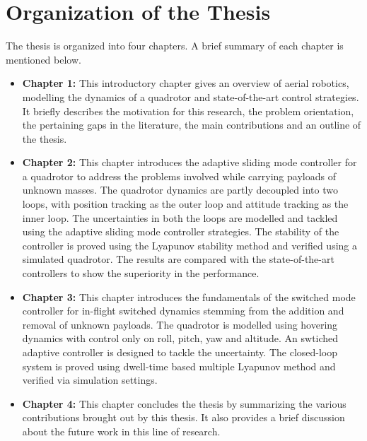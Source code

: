 \section{Organization of the Thesis}
The thesis is organized into four chapters. A brief summary of each chapter is mentioned below.

\begin{itemize}
    \item \textbf{Chapter 1:} This introductory chapter gives an overview of aerial robotics, modelling the dynamics of a quadrotor and state-of-the-art control strategies. It briefly describes the motivation for this research, the problem orientation, the pertaining gaps in the literature, the main contributions and an outline of the thesis.
    \item \textbf{Chapter 2:} This chapter introduces the adaptive sliding mode controller for a quadrotor to address the problems involved while carrying payloads of unknown masses. The quadrotor dynamics are partly decoupled into two loops, with position tracking as the outer loop and attitude tracking as the inner loop. The uncertainties in both the loops are modelled and tackled using the adaptive sliding mode controller strategies. The stability of the controller is proved using the Lyapunov stability method and verified using a simulated quadrotor. The results are compared with the state-of-the-art controllers to show the superiority in the performance.
    \item \textbf{Chapter 3:} This chapter introduces the fundamentals of the switched mode controller for in-flight switched dynamics stemming from the addition and removal of unknown payloads. The quadrotor is modelled using hovering dynamics with control only on roll, pitch, yaw and altitude. An swtiched adaptive controller is designed to tackle the uncertainty. The closed-loop system is proved using dwell-time based multiple Lyapunov method and verified via simulation settings.
    \item \textbf{Chapter 4:} This chapter concludes the thesis by summarizing the various contributions brought out by this thesis. It also provides a brief discussion about the future work in this line of research.
    
\end{itemize}

